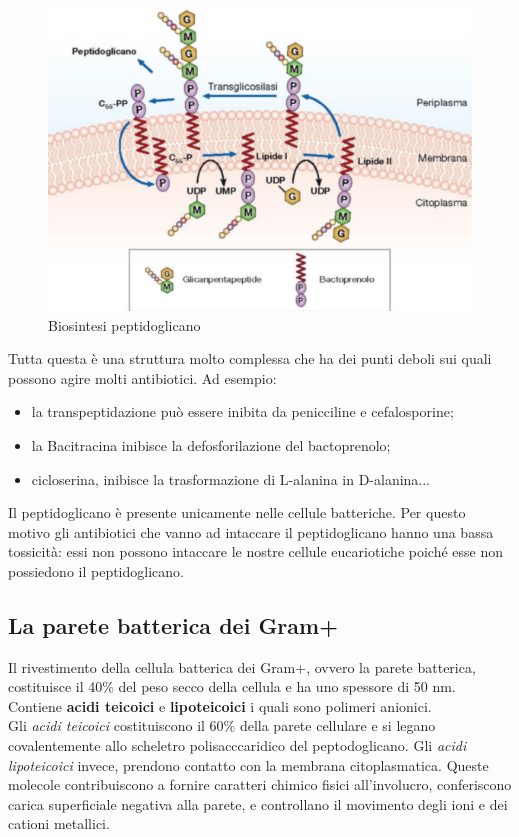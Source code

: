 \documentclass[11pt]{book}
\begin{document}
\begin{figure}[htp]
\centering
\includegraphics[scale=0.5]{img/Biosintesi peptidoglicano.png}
\caption{Biosintesi peptidoglicano}
\label{}
\end{figure}


\vspace{1em}
Tutta questa è una struttura molto complessa che ha dei punti deboli sui quali possono agire molti antibiotici. Ad esempio:
\begin{itemize}
\item la transpeptidazione può essere inibita da penicciline e cefalosporine;
\item la Bacitracina inibisce la defosforilazione del bactoprenolo;
\item cicloserina, inibisce la trasformazione di L-alanina in D-alanina...
\end{itemize}

Il peptidoglicano è presente unicamente nelle cellule batteriche. Per questo motivo gli antibiotici che vanno ad intaccare il peptidoglicano hanno una bassa tossicità: essi non possono intaccare le nostre cellule eucariotiche poiché esse non possiedono il peptidoglicano.

\subsection{La parete batterica dei Gram+}

Il rivestimento della cellula batterica dei Gram+, ovvero la parete batterica, costituisce il 40$\%$ del peso secco della cellula e ha uno spessore di 50 nm.\\
Contiene \textbf{acidi teicoici} e \textbf{lipoteicoici} i quali sono polimeri anionici.\\
Gli \emph{acidi teicoici} costituiscono il 60$\%$ della parete cellulare e si legano covalentemente allo scheletro polisacccaridico del peptodoglicano. Gli \emph{acidi lipoteicoici} invece, prendono contatto con la membrana citoplasmatica.
Queste molecole contribuiscono a fornire caratteri chimico fisici all’involucro, conferiscono carica superficiale negativa alla parete, e controllano il movimento degli ioni e dei cationi metallici.
\end{document}
